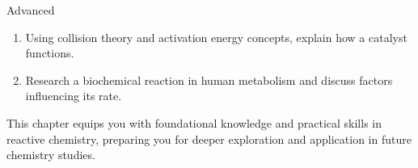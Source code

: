 \begin{tieredquestions}{Advanced}
\begin{enumerate}
    \item Using collision theory and activation energy concepts, explain how a catalyst functions.
    \item Research a biochemical reaction in human metabolism and discuss factors influencing its rate.
\end{enumerate}
\end{tieredquestions}

\FloatBarrier

This chapter equips you with foundational knowledge and practical skills in reactive chemistry, preparing you for deeper exploration and application in future chemistry studies.